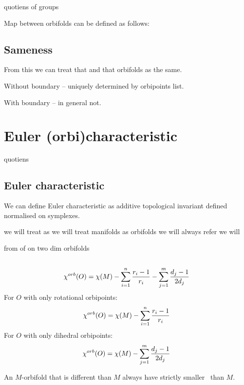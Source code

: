 quotiens of groups 

Map between orbifolds can be defined as follows:
\cite{kleiner2014geometrization}
\subsection{Sameness}\label{sameness}
From this we can treat that and that orbifolds as the same.

Without boundary -- uniquely determined by orbipoints list. 

With boundary -- in general not. 

\section{Euler (orbi)characteristic}\label{E_orb}
\label{\Eoc_as_a_sum}
quotiens
\subsection{Euler characteristic}
We can define Euler characteristic as additive topological invariant defined 
normalised on symplexes.

we will treat 
as we will treat manifolds as orbifolds we will always refer 
we will 

from of \Eoc on two dim orbifolds\label{\Eoc on 2d}

\subsection{\Eoc}
\begin{equation}\label{chi orb expression}
{\chi^{orb}(O)} = \chi (M) - \sum_{i=1}^n \frac{r_i-1}{r_i} - \sum_{j=1}^m \frac{d_j-1}{2d_j}
\end{equation}
For $O$ with only rotational orbipoints:
\begin{equation}\label{chi orb expression rotational}
{\chi^{orb}(O)} = \chi (M) - \sum_{i=1}^n \frac{r_i-1}{r_i}
\end{equation}
For $O$ with only dihedral orbipoints:
\begin{equation}\label{chi orb expression dihedral}
{\chi^{orb}(O)} = \chi (M) - \sum_{j=1}^m \frac{d_j-1}{2d_j}
\end{equation}

\begin{observation}\label{orbifolds have smaller Eoc than their base manifolds}
An $M$-orbifold that is different than $M$ always have strictly smaller \Eoc\ than $M$. 
\end{observation}

